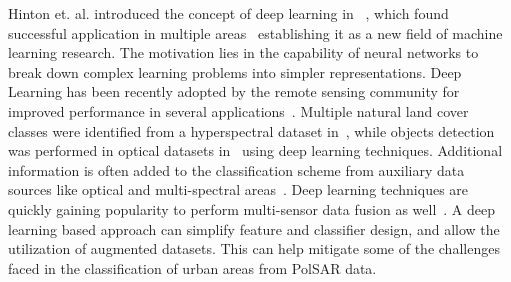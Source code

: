 Hinton et. al. introduced the concept of deep learning in ~\cite{hinton2006fast}, which found successful application in multiple areas~\cite{he2015delving, deng2013recent, glorot2011domain, mnih2013playing} establishing it as a new field of machine learning research. 
The motivation lies in the capability of neural networks to break down complex learning problems into simpler representations. Deep Learning has been recently adopted by the remote sensing community for improved performance in several applications~\cite{han2015object,tang2015compressed,chen2014vehicle}. Multiple natural land cover classes were identified from a hyperspectral dataset in~\cite{chen2014deep}, while objects detection was performed in optical datasets in~\cite{han2015object} using deep learning techniques. Additional information is often added to the classification scheme from auxiliary data sources like optical and multi-spectral areas~\cite{zhu2012assessment,6202721}. Deep learning techniques are quickly gaining popularity to perform multi-sensor data fusion as well~\cite{zhang2015deep,li2008remote}. A deep learning based approach can simplify feature and classifier design, and allow the utilization of augmented datasets. This can help mitigate some of the challenges faced in the classification of urban areas from PolSAR data.  





 
